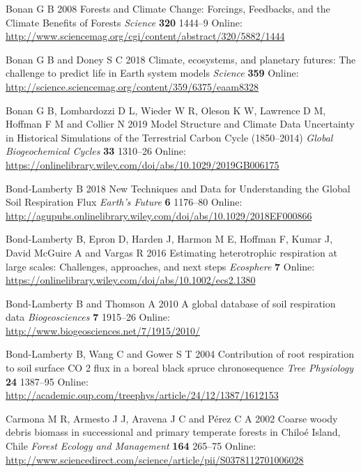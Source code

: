 \documentclass[
]{article}
\newlength{\cslhangindent}
\newenvironment{cslreferences}%
  {\setlength{\parindent}{0pt}%
  \everypar{\setlength{\hangindent}{\cslhangindent}}\ignorespaces}%
  {\par}
\begin{document}
\begin{cslreferences}
\leavevmode\hypertarget{ref-bonan_forests_2008}{}%
Bonan G B 2008 Forests and Climate Change: Forcings, Feedbacks, and the
Climate Benefits of Forests \emph{Science} \textbf{320} 1444--9 Online:
\url{http://www.sciencemag.org/cgi/content/abstract/320/5882/1444}

\leavevmode\hypertarget{ref-bonan_climate_2018}{}%
Bonan G B and Doney S C 2018 Climate, ecosystems, and planetary futures:
The challenge to predict life in Earth system models \emph{Science}
\textbf{359} Online:
\url{http://science.sciencemag.org/content/359/6375/eaam8328}

\leavevmode\hypertarget{ref-bonan_model_2019}{}%
Bonan G B, Lombardozzi D L, Wieder W R, Oleson K W, Lawrence D M,
Hoffman F M and Collier N 2019 Model Structure and Climate Data
Uncertainty in Historical Simulations of the Terrestrial Carbon Cycle
(1850--2014) \emph{Global Biogeochemical Cycles} \textbf{33} 1310--26
Online:
\url{https://onlinelibrary.wiley.com/doi/abs/10.1029/2019GB006175}

\leavevmode\hypertarget{ref-bondlamberty_new_2018}{}%
Bond‐Lamberty B 2018 New Techniques and Data for Understanding the
Global Soil Respiration Flux \emph{Earth's Future} \textbf{6} 1176--80
Online:
\url{http://agupubs.onlinelibrary.wiley.com/doi/abs/10.1029/2018EF000866}

\leavevmode\hypertarget{ref-bondlamberty_estimating_2016}{}%
Bond‐Lamberty B, Epron D, Harden J, Harmon M E, Hoffman F, Kumar J,
David McGuire A and Vargas R 2016 Estimating heterotrophic respiration
at large scales: Challenges, approaches, and next steps \emph{Ecosphere}
\textbf{7} Online:
\url{https://onlinelibrary.wiley.com/doi/abs/10.1002/ecs2.1380}

\leavevmode\hypertarget{ref-bond-lamberty_global_2010}{}%
Bond-Lamberty B and Thomson A 2010 A global database of soil respiration
data \emph{Biogeosciences} \textbf{7} 1915--26 Online:
\url{http://www.biogeosciences.net/7/1915/2010/}

\leavevmode\hypertarget{ref-bond-lamberty_contribution_2004}{}%
Bond-Lamberty B, Wang C and Gower S T 2004 Contribution of root
respiration to soil surface CO 2 flux in a boreal black spruce
chronosequence \emph{Tree Physiology} \textbf{24} 1387--95 Online:
\url{http://academic.oup.com/treephys/article/24/12/1387/1612153}

\leavevmode\hypertarget{ref-carmona_coarse_2002}{}%
Carmona M R, Armesto J J, Aravena J C and Pérez C A 2002 Coarse woody
debris biomass in successional and primary temperate forests in Chiloé
Island, Chile \emph{Forest Ecology and Management} \textbf{164} 265--75
Online:
\url{http://www.sciencedirect.com/science/article/pii/S0378112701006028}


\end{cslreferences}
\end{document}
